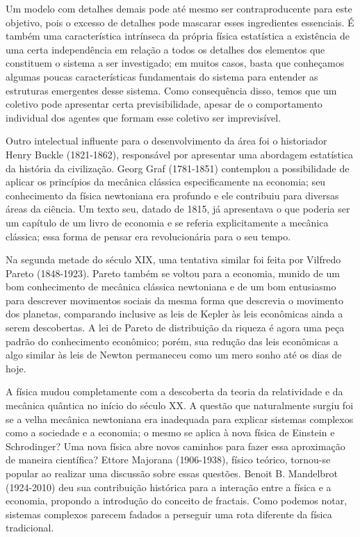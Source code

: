 Um modelo com detalhes demais pode até mesmo ser contraproducente para este objetivo, pois o excesso de detalhes pode mascarar esses ingredientes essenciais. É também uma característica intrínseca da própria física estatística a existência de uma certa independência em relação a todos os detalhes dos elementos que constituem o sistema a ser investigado; em muitos casos, basta que conheçamos algumas poucas características fundamentais do sistema  para entender as estruturas emergentes desse sistema. Como consequência disso, temos que um coletivo pode apresentar certa previsibilidade, apesar de o comportamento individual dos agentes que formam esse coletivo ser imprevisível.

Outro intelectual influente para o desenvolvimento da área foi o historiador Henry Buckle (1821-1862), responsável por apresentar uma abordagem estatística da história  da civilização. Georg Graf (1781-1851) contemplou  a possibilidade de aplicar os princípios da mecânica clássica especificamente na economia; seu conhecimento da física newtoniana era profundo e ele contribuiu para diversas áreas da ciência. Um texto seu, datado de 1815, já apresentava o que poderia ser um capítulo de um livro de economia e se referia explicitamente a mecânica clássica; essa forma de pensar era revolucionária para o seu tempo. 

Na segunda metade do século XIX, uma tentativa similar foi feita por Vilfredo Pareto (1848-1923). Pareto também se voltou para a economia, munido de um bom conhecimento de mecânica clássica newtoniana e de um bom entusiasmo para descrever movimentos sociais da mesma forma que descrevia o movimento dos planetas, comparando inclusive as leis de Kepler às leis econômicas ainda a serem descobertas. A lei de Pareto de distribuição da riqueza é agora uma peça padrão do conhecimento econômico; porém, sua redução das leis econômicas a algo similar às leis de Newton permaneceu como um mero sonho até os dias de hoje.

A física mudou completamente com a descoberta da teoria da relatividade e da mecânica quântica no início do século XX. A questão que naturalmente surgiu foi se a velha mecânica newtoniana era inadequada para explicar sistemas complexos como a sociedade e a economia; o mesmo se aplica à nova física de Einstein e Schrodinger? Uma nova física abre novos caminhos para fazer essa aproximação de maneira científica? Ettore Majorana (1906-1938), físico teórico, tornou-se popular ao realizar uma discussão sobre essas questões. Benoit B. Mandelbrot (1924-2010) deu sua contribuição histórica para a interação entre a física e a economia, propondo a introdução do conceito de fractais. Como podemos notar, sistemas complexos parecem fadados a perseguir uma rota diferente da física tradicional.


